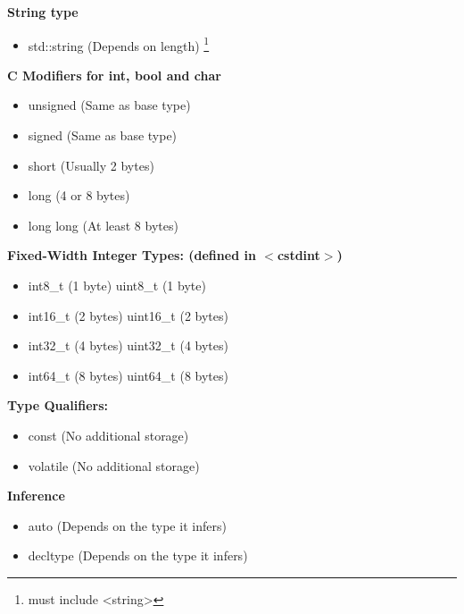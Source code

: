 \documentclass{report}
\begin{document}
\begin{minipage}{0.47\textwidth}
    \textbf{String type}
    \begin{itemize}
        \item std::string (Depends on length) \footnote{must include <string>}
    \end{itemize}
\end{minipage}
\bigbreak \noindent \bigbreak \noindent 
\begin{minipage}[t]{0.47\textwidth}
    \textbf{C Modifiers for int, bool and char}
    \begin{itemize}
        \item unsigned (Same as base type)
        \item signed  (Same as base type)
        \item short (Usually 2 bytes)
        \item long (4 or 8 bytes)
        \item long long (At least 8 bytes)
    \end{itemize}
\end{minipage}
\begin{minipage}[t]{0.47\textwidth}
    \textbf{Fixed-Width Integer Types: (defined in $<$cstdint$>$)}
    \begin{itemize}
        \item int8\_t (1 byte) \quad \quad \textbullet uint8\_t (1 byte)
        \item int16\_t (2 bytes) \quad \textbullet uint16\_t (2 bytes)
        \item int32\_t (4 bytes) \quad \textbullet uint32\_t (4 bytes)
        \item int64\_t (8 bytes) \quad \textbullet uint64\_t (8 bytes)
    \end{itemize}
\end{minipage}
\bigbreak \noindent \bigbreak \noindent 
\begin{minipage}[t]{0.47\textwidth}
    \textbf{Type Qualifiers:}
    \begin{itemize}
        \item const (No additional storage)
        \item volatile (No additional storage)
    \end{itemize}
\end{minipage}
\begin{minipage}[t]{0.47\textwidth}
    \textbf{Inference}
    \begin{itemize}
        \item auto (Depends on the type it infers)
        \item decltype (Depends on the type it infers)
    \end{itemize}
\end{minipage}
\end{document}
